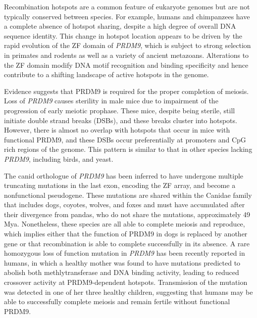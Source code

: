 Recombination hotspots are a common feature of eukaryote genomes but are not typically conserved between species.
For example, humans and chimpanzees have a complete absence of hotspot sharing, despite a high degree of overall DNA sequence identity\cite{Ptak2005,Winckler2005,Auton2012a}.
This change in hotspot location appears to be driven by the rapid evolution of the
ZF domain of \textit{PRDM9}, which is subject to strong selection in primates and rodents as well as a variety of ancient metazoans\cite{Oliver2009}.
Alterations to the ZF domain modify DNA motif recognition and binding specificity\cite{Oliver2009}
and hence contribute to a shifting landscape of active hotspots in the genome.

Evidence suggests that PRDM9 is required for the proper completion of meiosis.
Loss of \textit{PRDM9} causes sterility in male mice due to impairment of the progression of early meiotic prophase\cite{Hayashi2005}.
These mice, despite being sterile, still initiate double strand breaks (DSBs), and these breaks cluster into hotspots.
However, there is almost no overlap with hotspots that occur in mice with functional PRDM9, and these DSBs occur preferentially at promoters and CpG rich regions of the genome\cite{Brick2012}.  
This pattern is similar to that in other species lacking \textit{PRDM9}, including birds\cite{Singhal2015}, and yeast\cite{Lam2015}. 

The canid orthologue of \textit{PRDM9} has been inferred to have undergone multiple truncating mutations in the last exon, encoding the ZF array, and become a nonfunctional pseudogene\cite{Munoz-Fuentes2011}.
These mutations are shared within the Canidae family that includes dogs, coyotes, wolves, and foxes and must have accumulated after their divergence from pandas, who do not share the mutations, approximately 49 Mya\cite{Oliver2009,Munoz-Fuentes2011,Axelsson2012,Auton2013}.
Nonetheless, these species are all able to complete meiosis and reproduce,
which implies either that the function of PRDM9 in dogs is replaced by another gene or that recombination is able to complete successfully in its absence.
A rare homozygous loss of function mutation in \textit{PRDM9} has been recently reported in humans, in which a healthy mother was found to have mutations predicted to abolish both methlytransferase and DNA binding activity\cite{Narasimhan2016}, leading to 
 reduced crossover activity at PRDM9-dependent hotspots.
Transmission of the mutation was detected in one of her three healthy children, suggesting that humans may be able to successfully complete meiosis and remain fertile without functional PRDM9.

